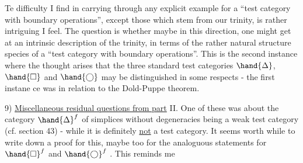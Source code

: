 Te difficulty I find in carrying through any explicit example
for a ``test category with boundary operations'',  except those which stem
from our trinity,  is rather intriguing I feel.  The question is whether
maybe in this direction,  one might get at an intrinsic description of
the trinity,  in terms of the rather natural structure species of a
``test category with boundary operations''.  This is the second instance
where the thought arises that the three standard test categories
$\hand{\Delta}$, $\hand{\square}$ and $\hand{\bigcirc}$ may be distinguished in some respects  -  the first instane
ce was in relation to the Dold-Puppe theorem.

9)  \uline{Miscellaneous residual questions from part} II.  One of these
was about the category $\hand{\Delta}^f$ of  simplices without degeneracies being a
weak test category (cf. section 43)  -  while it is definitely \uline{not} a test
category.  It seems worth while to write down a proof for this,  maybe
too for the analoguous statements for $\hand{\square}^f$  and $\hand{\bigcirc}^f$ .  This reminds me


